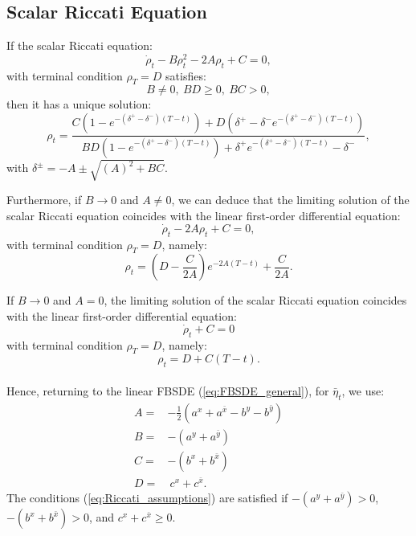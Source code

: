 \documentclass[11pt]{article}
\begin{document}
\begin{appendices}
\subsection*{\textbf{Scalar Riccati Equation}} If the scalar Riccati equation: 
	\begin{equation*}
		\dot{\rho}_t - B \rho_t^2 - 2A \rho_t  + C = 0, 
	\end{equation*}
	with terminal condition $\rho_T = D$ satisfies:
	\begin{equation}
		B \neq 0,\ BD \geq 0,\ BC>0,
	\label{eq:Riccati_assumptions}
	\end{equation}
	then it has a unique solution:
\begin{equation}
		\rho_t= \frac{C(1-e^{-(\delta^+ - \delta^-)(T-t)})+D( \delta^+ -\delta^-e^{-(\delta^+ - \delta^-)(T-t)}) }{BD(1-e^{-(\delta^+ - \delta^-)(T-t)})+ \delta^+e^{-(\delta^+ - \delta^-)(T-t)}  -\delta^- },
	\label{eq:riccati_ut_sol_app}
\end{equation}
	with $\delta^\pm = -A \pm \sqrt{(A)^2 + B C}$.
	
	Furthermore, if $B \to 0$ and $A\neq 0$, we can deduce that the limiting solution of the scalar Riccati equation coincides with the linear first-order differential equation:
	\begin{equation*}
		\dot{\rho}_t - 2A \rho_t +C = 0,
	\end{equation*}
	with terminal condition $\rho_T = D$, namely:
	\begin{equation*}
		\rho_t = \left(D - \frac{C}{2A} \right) e^{-2A (T-t)} + \frac{C}{2A}.
	\end{equation*}
	
	If $B \to 0$ and $A = 0$, the limiting solution of the scalar Riccati equation coincides with the linear first-order differential equation:
	\begin{equation*}
	    \dot{\rho}_t +C = 0
	\end{equation*}
	with terminal condition $\rho_T = D$, namely:
	\begin{equation*}
	    \rho_t = D + C(T-t).
	\end{equation*}\\
Hence, returning to the linear FBSDE (\ref{eq:FBSDE_general}), for $\bar{\eta}_t$, we use:
\begin{equation*}
	\begin{array}{rl}
		A=&-\frac{1}{2}(a^x+a^{\bar{x}}-b^y-b^{\bar{y}}) \\
		B=&-(a^y+a^{\bar{y}}) \\
		C=&-(b^x+b^{\bar{x}}) \\
		D=&\ c^x+c^{\bar{x}}.
	\end{array}
\end{equation*}
The conditions (\ref{eq:Riccati_assumptions}) are satisfied if $-(a^y+a^{\bar{y}})>0$, $-(b^x+b^{\bar{x}})>0$, and $c^x+c^{\bar{x}} \geq 0$.


\end{appendices}
\end{document}
